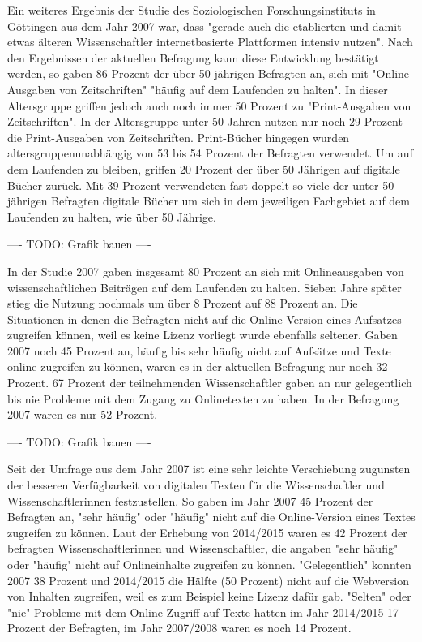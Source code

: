 Ein weiteres Ergebnis der Studie des Soziologischen Forschungsinstituts in Göttingen aus dem Jahr 2007 war, dass "gerade auch die etablierten und damit etwas älteren Wissenschaftler internetbasierte Plattformen intensiv nutzen". Nach den Ergebnissen der aktuellen Befragung kann diese Entwicklung bestätigt werden, so gaben 86 Prozent der über 50-jährigen Befragten an, sich mit "Online-Ausgaben von Zeitschriften" "häufig auf dem Laufenden zu halten". In dieser Altersgruppe griffen jedoch auch noch immer 50 Prozent zu "Print-Ausgaben von Zeitschriften". In der Altersgruppe unter 50 Jahren nutzen nur noch 29 Prozent die Print-Ausgaben von Zeitschriften. Print-Bücher hingegen wurden altersgruppenunabhängig von 53 bis 54 Prozent der Befragten verwendet. Um auf dem Laufenden zu bleiben, griffen 20 Prozent der über 50 Jährigen auf digitale Bücher zurück. Mit 39 Prozent verwendeten fast doppelt so viele der unter 50 jährigen Befragten digitale Bücher um sich in dem jeweiligen Fachgebiet auf dem Laufenden zu halten, wie über 50 Jährige.

---- TODO: Grafik bauen ----

In der Studie 2007 gaben insgesamt 80 Prozent an sich mit Onlineausgaben von wissenschaftlichen Beiträgen auf dem Laufenden zu halten. Sieben Jahre später stieg die Nutzung nochmals um über 8 Prozent auf 88 Prozent an. Die Situationen in denen die Befragten nicht auf die Online-Version eines Aufsatzes zugreifen können, weil es keine Lizenz vorliegt wurde ebenfalls seltener. Gaben 2007 noch 45 Prozent an, häufig bis sehr häufig nicht auf Aufsätze und Texte online zugreifen zu können, waren es in der aktuellen Befragung nur noch 32 Prozent. 67 Prozent der teilnehmenden Wissenschaftler gaben an nur gelegentlich bis nie Probleme mit dem Zugang zu Onlinetexten zu haben. In der Befragung 2007 waren es nur 52 Prozent.

---- TODO: Grafik bauen ----

Seit der Umfrage aus dem Jahr 2007 ist eine sehr leichte Verschiebung zu­guns­ten der besseren Verfügbarkeit von digitalen Texten für die Wissenschaftler und Wissenschaftlerinnen festzustellen. So gaben im Jahr 2007 45 Prozent der Befragten an, "sehr häufig" oder "häufig" nicht auf die Online-Version eines Textes zugreifen zu können. Laut der Erhebung von 2014/2015 waren es 42 Prozent der befragten Wissenschaftlerinnen und Wissenschaftler, die angaben "sehr häufig" oder "häufig" nicht auf Onlineinhalte zugreifen zu können. "Gelegentlich" konnten 2007 38 Prozent und 2014/2015 die Hälfte (50 Prozent) nicht auf die Webversion von Inhalten zugreifen, weil es zum Beispiel keine Lizenz dafür gab. "Selten" oder "nie" Probleme mit dem Online-Zugriff auf Texte hatten im Jahr 2014/2015 17 Prozent der Befragten, im Jahr 2007/2008 waren es noch 14 Prozent.

